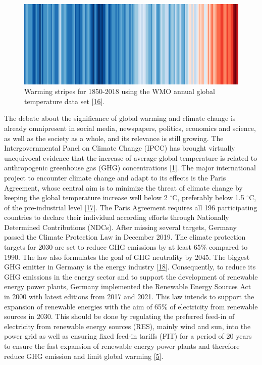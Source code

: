 \documentclass[a4paper,11pt]{article}
\begin{document}
\begin{figure}

{\centering \includegraphics[width=1\linewidth,height=0.07\textheight]{figures/wmo_stripes} 

}

\caption{Warming stripes for 1850-2018 using the WMO annual global temperature data set {[}\protect\hyperlink{ref-EdHawkins.2018}{16}{]}.}\label{fig:wmo}
\end{figure}
The debate about the significance of global warming and climate change is already omnipresent in social media, newspapers, politics, economics and science, as well as the society as a whole, and its relevance is still growing. The Intergovernmental Panel on Climate Change (IPCC) has brought virtually unequivocal evidence that the increase of average global temperature is related to anthropogenic greenhouse gas (GHG) concentrations
{[}\protect\hyperlink{ref-IntergovernmentalPanelonClimateChange.2014}{1}{]}. The major international project to encounter climate change and adapt to its effects is the Paris Agreement, whose central aim is to minimize the threat of climate
change by keeping the global temperature increase well below 2 \(^\circ\)C, preferably below 1.5 \(^\circ\)C, of the pre-industrial level {[}\protect\hyperlink{ref-UnitedNations.2015}{17}{]}. The Paris Agreement requires all 196 participating countries to declare their individual according efforts through Nationally Determined Contributions (NDCs). After missing several targets, Germany passed the Climate Protection Law in December 2019. The climate protection targets for 2030 are set to reduce GHG emissions by at least 65\% compared to 1990. The law also formulates the goal of GHG neutrality by 2045. The biggest GHG emitter in Germany is the energy industry {[}\protect\hyperlink{ref-Umweltbundesamt.2018}{18}{]}. Consequently, to reduce its GHG emissions in the energy sector and to support the development of renewable energy power plants, Germany implemented the Renewable Energy Sources Act in 2000 with latest editions from 2017 and 2021. This law intends to support the expansion of renewable energies with the aim of 65\% of electricity from renewable sources in 2030. This should be done by regulating the preferred feed-in of electricity from renewable energy sources (RES), mainly wind and sun, into the power grid as well as ensuring fixed feed-in tariffs (FIT) for a period of 20 years to ensure the fast expansion of renewable energy power plants and therefore reduce GHG emission and limit global warming {[}\protect\hyperlink{ref-BundesamtfurJustiz.2021}{5}{]}.
\end{document}
